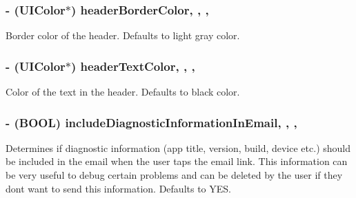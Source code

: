 \subsubsection[{header\+Border\+Color}]{\setlength{\rightskip}{0pt plus 5cm}-\/ (U\+I\+Color$\ast$) header\+Border\+Color\hspace{0.3cm}{\ttfamily [read]}, {\ttfamily [write]}, {\ttfamily [nonatomic]}, {\ttfamily [strong]}}\label{interface_r_f_about_view_controller_ad1c77f147663e58a79c328e4f3cf0d7b}
Border color of the header. Defaults to light gray color. \hypertarget{interface_r_f_about_view_controller_ac3df88bf9ad9ff5bc15476d34a4ffc9d}{}
\subsubsection[{header\+Text\+Color}]{\setlength{\rightskip}{0pt plus 5cm}-\/ (U\+I\+Color$\ast$) header\+Text\+Color\hspace{0.3cm}{\ttfamily [read]}, {\ttfamily [write]}, {\ttfamily [nonatomic]}, {\ttfamily [strong]}}\label{interface_r_f_about_view_controller_ac3df88bf9ad9ff5bc15476d34a4ffc9d}
Color of the text in the header. Defaults to black color. \hypertarget{interface_r_f_about_view_controller_a8d3b2217c6804e41c54bb1592069c3b2}{}
\subsubsection[{include\+Diagnostic\+Information\+In\+Email}]{\setlength{\rightskip}{0pt plus 5cm}-\/ (B\+O\+O\+L) include\+Diagnostic\+Information\+In\+Email\hspace{0.3cm}{\ttfamily [read]}, {\ttfamily [write]}, {\ttfamily [nonatomic]}, {\ttfamily [assign]}}\label{interface_r_f_about_view_controller_a8d3b2217c6804e41c54bb1592069c3b2}
Determines if diagnostic information (app title, version, build, device etc.) should be included in the email when the user taps the email link. This information can be very useful to debug certain problems and can be deleted by the user if they don\textquotesingle{}t want to send this information. Defaults to Y\+E\+S. \hypertarget{interface_r_f_about_view_controller_aeed798742a135ee9f1412e72caf7ffd3}{}
